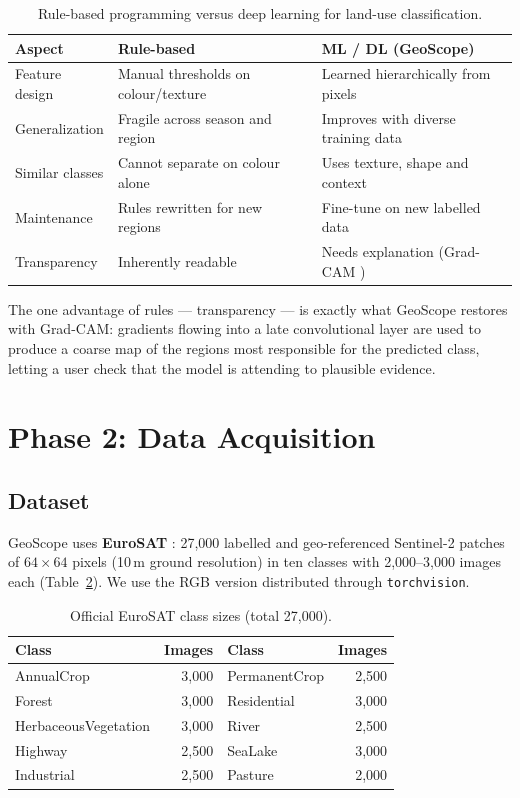 \documentclass[11pt,a4paper]{article}
\begin{document}
\begin{table}[H]
\centering
\small
\begin{tabular}{@{}p{3.2cm}p{5.8cm}p{5.8cm}@{}}
\toprule
\textbf{Aspect} & \textbf{Rule-based} & \textbf{ML / DL (GeoScope)}\\
\midrule
Feature design & Manual thresholds on colour/texture & Learned hierarchically from pixels\\
Generalization & Fragile across season and region & Improves with diverse training data\\
Similar classes & Cannot separate on colour alone & Uses texture, shape and context\\
Maintenance & Rules rewritten for new regions & Fine-tune on new labelled data\\
Transparency & Inherently readable & Needs explanation (Grad-CAM \cite{selvaraju2017})\\
\bottomrule
\end{tabular}
\caption{Rule-based programming versus deep learning for land-use classification.}
\label{tab:rule-vs-ml}
\end{table}

The one advantage of rules --- transparency --- is exactly what GeoScope restores with Grad-CAM:
gradients flowing into a late convolutional layer are used to produce a coarse map of the regions
most responsible for the predicted class, letting a user check that the model is attending to
plausible evidence.

\section{Phase 2: Data Acquisition}

\subsection{Dataset}
GeoScope uses \textbf{EuroSAT} \cite{helber2019}: 27{,}000 labelled and geo-referenced Sentinel-2
patches of $64\times64$ pixels (10\,m ground resolution) in ten classes with 2{,}000--3{,}000 images
each (Table~\ref{tab:classes}). We use the RGB version distributed through \texttt{torchvision}.

\begin{table}[H]
\centering
\small
\begin{tabular}{@{}l r l r@{}}
\toprule
\textbf{Class} & \textbf{Images} & \textbf{Class} & \textbf{Images}\\
\midrule
AnnualCrop & 3{,}000 & PermanentCrop & 2{,}500\\
Forest & 3{,}000 & Residential & 3{,}000\\
HerbaceousVegetation & 3{,}000 & River & 2{,}500\\
Highway & 2{,}500 & SeaLake & 3{,}000\\
Industrial & 2{,}500 & Pasture & 2{,}000\\
\bottomrule
\end{tabular}
\caption{Official EuroSAT class sizes (total 27{,}000).}
\label{tab:classes}
\end{table}
\end{document}
